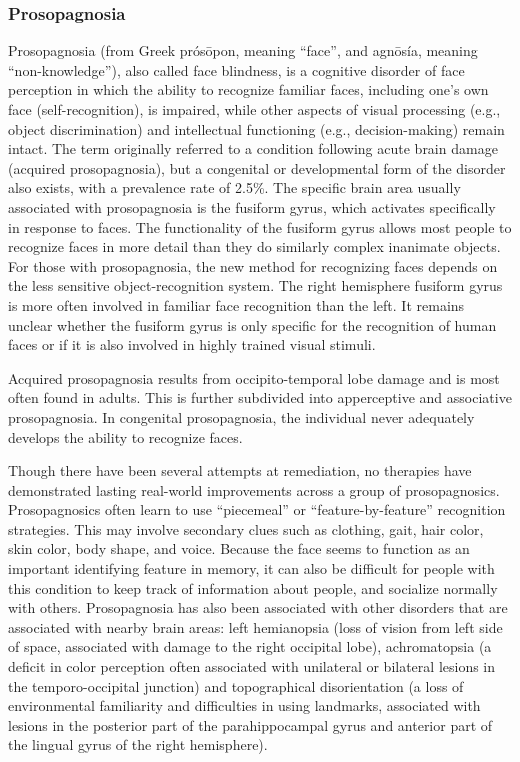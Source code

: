 \hypertarget{prosopagnosia}{%
\subsubsection{Prosopagnosia}\label{prosopagnosia}}

Prosopagnosia (from Greek prósōpon, meaning ``face'', and agnōsía,
meaning ``non-knowledge''), also called face blindness, is a cognitive
disorder of face perception in which the ability to recognize familiar
faces, including one's own face (self-recognition), is impaired, while
other aspects of visual processing (e.g., object discrimination) and
intellectual functioning (e.g., decision-making) remain intact. The term
originally referred to a condition following acute brain damage
(acquired prosopagnosia), but a congenital or developmental form of the
disorder also exists, with a prevalence rate of 2.5\%. The specific
brain area usually associated with prosopagnosia is the fusiform gyrus,
which activates specifically in response to faces. The functionality of
the fusiform gyrus allows most people to recognize faces in more detail
than they do similarly complex inanimate objects. For those with
prosopagnosia, the new method for recognizing faces depends on the less
sensitive object-recognition system. The right hemisphere fusiform gyrus
is more often involved in familiar face recognition than the left. It
remains unclear whether the fusiform gyrus is only specific for the
recognition of human faces or if it is also involved in highly trained
visual stimuli.

Acquired prosopagnosia results from occipito-temporal lobe damage and is
most often found in adults. This is further subdivided into apperceptive
and associative prosopagnosia. In congenital prosopagnosia, the
individual never adequately develops the ability to recognize faces.

Though there have been several attempts at remediation, no therapies
have demonstrated lasting real-world improvements across a group of
prosopagnosics. Prosopagnosics often learn to use ``piecemeal'' or
``feature-by-feature'' recognition strategies. This may involve
secondary clues such as clothing, gait, hair color, skin color, body
shape, and voice. Because the face seems to function as an important
identifying feature in memory, it can also be difficult for people with
this condition to keep track of information about people, and socialize
normally with others. Prosopagnosia has also been associated with other
disorders that are associated with nearby brain areas: left hemianopsia
(loss of vision from left side of space, associated with damage to the
right occipital lobe), achromatopsia (a deficit in color perception
often associated with unilateral or bilateral lesions in the
temporo-occipital junction) and topographical disorientation (a loss of
environmental familiarity and difficulties in using landmarks,
associated with lesions in the posterior part of the parahippocampal
gyrus and anterior part of the lingual gyrus of the right hemisphere).

